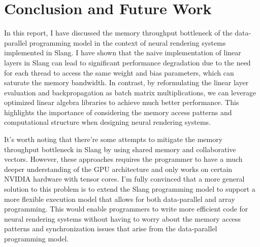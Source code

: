 \documentclass{article}
\begin{document}
\section{Conclusion and Future Work}

In this report, I have discussed the memory throughput bottleneck of the data-parallel programming model in the context of neural rendering systems implemented in Slang. I have shown that the naive implementation of linear layers in Slang can lead to significant performance degradation due to the need for each thread to access the same weight and bias parameters, which can saturate the memory bandwidth. In contrast, by reformulating the linear layer evaluation and backpropagation as batch matrix multiplications, we can leverage optimized linear algebra libraries to achieve much better performance. This highlights the importance of considering the memory access patterns and computational structure when designing neural rendering systems.

It's worth noting that there're some attempts to mitigate the memory throughput bottleneck in Slang by using shared memory and collaborative vectors. However, these approaches requires the programmer to have a much deeper understanding of the GPU architecture and only works on certain NVIDIA hardware with tensor cores. I'm fully convinced that a more general solution to this problem is to extend the Slang programming model to support a more flexible execution model that allows for both data-parallel and array programming. This would enable programmers to write more efficient code for neural rendering systems without having to worry about the memory access patterns and synchronization issues that arise from the data-parallel programming model.



\end{document}
